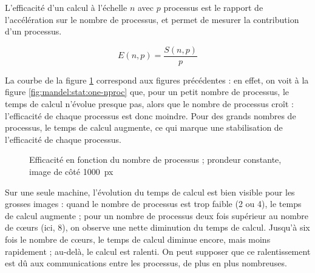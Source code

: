 L'efficacité d'un calcul à l'échelle $n$ avec $p$ processus est le
rapport de l'accélération sur le nombre de processus, et permet de
mesurer la contribution d'un processus.

$$ E(n,p) = \frac{S(n,p)}{p} $$

La courbe de la figure \ref{fig:mandel:stat:efficacite-nproc}
correspond aux figures précédentes : en effet, on voit à la figure
\ref{fig:mandel:stat:one-nproc} que, pour un petit nombre de
processus, le temps de calcul n'évolue presque pas, alors que le
nombre de processus croît : l'efficacité de chaque processus est donc
moindre. Pour des grands nombres de processus, le temps de calcul
augmente, ce qui marque une stabilisation de l'efficacité de chaque
processus.

\begin{figure}
  \centering


  \caption{Efficacité en fonction du nombre de processus ;
    prondeur constante, image de côté 1000~px}
  \label{fig:mandel:stat:efficacite-nproc}
\end{figure}

Sur une seule machine, l'évolution du temps de calcul est bien visible
pour les grosses images : quand le nombre de processus est trop faible
(2 ou 4), le temps de calcul augmente ; pour un nombre de processus
deux fois supérieur au nombre de cœurs (ici, 8), on observe une nette
diminution du temps de calcul. Jusqu'à six fois le nombre de cœurs, le
temps de calcul diminue encore, mais moins rapidement ; au-delà, le
calcul est ralenti. On peut supposer que ce ralentissement est dû aux
communications entre les processus, de plus en plus nombreuses.


